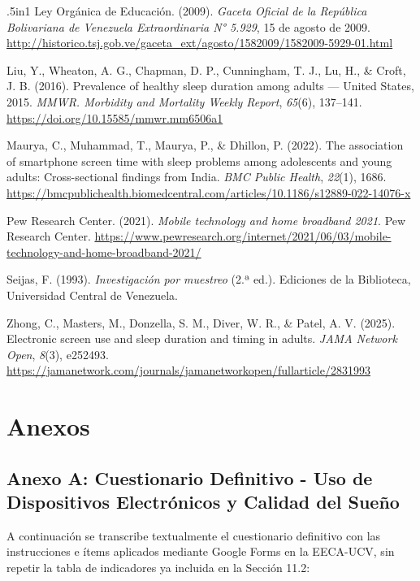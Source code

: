 \documentclass[12pt, letterpaper]{article}
\begin{document}
{\begin{hangparas}{.5in}{1}
Ley Orgánica de Educación. (2009). \textit{Gaceta Oficial de la República Bolivariana de Venezuela Extraordinaria N° 5.929}, 15 de agosto de 2009. \url{http://historico.tsj.gob.ve/gaceta_ext/agosto/1582009/1582009-5929-01.html}

Liu, Y., Wheaton, A. G., Chapman, D. P., Cunningham, T. J., Lu, H., \& Croft, J. B. (2016). Prevalence of healthy sleep duration among adults --- United States, 2015. \textit{MMWR. Morbidity and Mortality Weekly Report}, \textit{65}(6), 137--141. \url{https://doi.org/10.15585/mmwr.mm6506a1}

Maurya, C., Muhammad, T., Maurya, P., \& Dhillon, P. (2022). The association of smartphone screen time with sleep problems among adolescents and young adults: Cross-sectional findings from India. \textit{BMC Public Health}, \textit{22}(1), 1686. \url{https://bmcpublichealth.biomedcentral.com/articles/10.1186/s12889-022-14076-x}

Pew Research Center. (2021). \textit{Mobile technology and home broadband 2021}. Pew Research Center. \url{https://www.pewresearch.org/internet/2021/06/03/mobile-technology-and-home-broadband-2021/}

Seijas, F. (1993). \textit{Investigación por muestreo} (2.ª ed.). Ediciones de la Biblioteca, Universidad Central de Venezuela.

Zhong, C., Masters, M., Donzella, S. M., Diver, W. R., \& Patel, A. V. (2025). Electronic screen use and sleep duration and timing in adults. \textit{JAMA Network Open}, \textit{8}(3), e252493. \url{https://jamanetwork.com/journals/jamanetworkopen/fullarticle/2831993}
\end{hangparas}
}


\newpage
\section{Anexos}

\subsection{Anexo A: Cuestionario Definitivo - Uso de Dispositivos Electrónicos y Calidad del Sueño}

A continuación se transcribe textualmente el cuestionario definitivo con las instrucciones e ítems aplicados mediante Google Forms en la EECA-UCV, sin repetir la tabla de indicadores ya incluida en la Sección 11.2:
\end{document}

